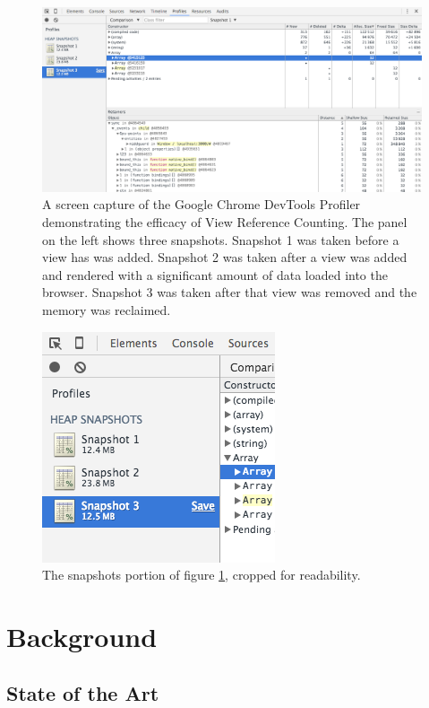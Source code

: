 \documentclass[midd]{thesis}
\begin{document}
\begin{figure}[!ht]
  \centering
  \includegraphics[width=1\textwidth]{devtools-snapshot}
  \caption{A screen capture of the Google Chrome DevTools Profiler demonstrating
  the efficacy of View Reference Counting. The panel on the left shows three
  snapshots. Snapshot 1 was taken before a view has was added. Snapshot 2 was
  taken after a view was added and rendered with a significant amount of data
  loaded into the browser. Snapshot 3 was taken after that view was removed and
  the memory was reclaimed.}
  \label{fig:vrc}
\end{figure}

\begin{figure}[!ht]
  \centering
  \includegraphics{devtools-snapshot-cropped}
  \caption{The snapshots portion of figure \ref{fig:vrc}, cropped for
  readability.}
  \label{fig:vrccropped}
\end{figure}

\chapter{Background}

\section{State of the Art}
\end{document}
